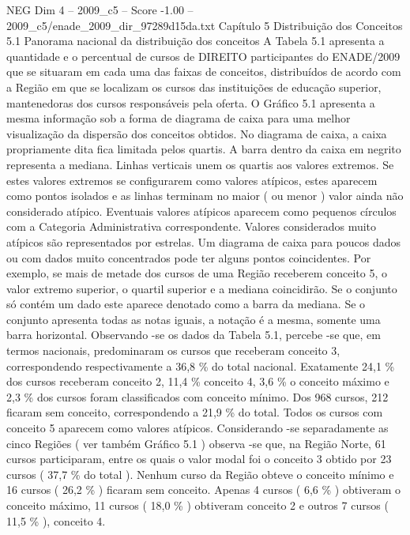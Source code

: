 \begin{textsample}{NEG Dim 4 – 2009\_c5 – Score -1.00 – 2009\_c5/enade\_2009\_dir\_97289d15da.txt}  \label{ex:f4_neg_086}
Capítulo 5 Distribuição dos Conceitos 5.1 Panorama nacional da distribuição dos conceitos A Tabela 5.1 apresenta a quantidade e o percentual de cursos de DIREITO participantes do ENADE/2009 que se situaram em cada uma das faixas de conceitos, distribuídos de acordo com a Região em que se localizam os cursos das instituições de educação superior, mantenedoras dos cursos responsáveis pela oferta.
O Gráfico 5.1 apresenta a mesma informação sob a forma de diagrama de caixa para uma melhor visualização da dispersão dos conceitos obtidos.
No diagrama de caixa, a caixa propriamente dita fica limitada pelos quartis.
A barra dentro da caixa em negrito representa a mediana.
Linhas verticais unem os quartis aos valores extremos.
Se estes valores extremos se configurarem como valores atípicos, estes aparecem como pontos isolados e as linhas terminam no maior ( ou menor ) valor ainda não considerado atípico.
Eventuais valores atípicos aparecem como pequenos círculos com a Categoria Administrativa correspondente.
Valores considerados muito atípicos são representados por estrelas.
Um diagrama de caixa para poucos dados ou com dados muito concentrados pode ter alguns pontos coincidentes.
Por exemplo, se mais de metade dos cursos de uma Região receberem conceito 5, o valor extremo superior, o quartil superior e a mediana coincidirão.
Se o conjunto só contém um dado este aparece denotado como a barra da mediana.
Se o conjunto apresenta todas as notas iguais, a notação é a mesma, somente uma barra horizontal.
Observando -se os dados da Tabela 5.1, percebe -se que, em termos nacionais, predominaram os cursos que receberam conceito 3, correspondendo respectivamente a 36,8 \% do total nacional.
Exatamente 24,1 \% dos cursos receberam conceito 2, 11,4 \% conceito 4, 3,6 \% o conceito máximo e 2,3 \% dos cursos foram classificados com conceito mínimo.
Dos 968 cursos, 212 ficaram sem conceito, correspondendo a 21,9 \% do total.
Todos os cursos com conceito 5 aparecem como valores atípicos.
Considerando -se separadamente as cinco Regiões ( ver também Gráfico 5.1 ) observa -se que, na Região Norte, 61 cursos participaram, entre os quais o valor modal foi o conceito 3 obtido por 23 cursos ( 37,7 \% do total ).
Nenhum curso da Região obteve o conceito mínimo e 16 cursos ( 26,2 \% ) ficaram sem conceito.
Apenas 4 cursos ( 6,6 \% ) obtiveram o conceito máximo, 11 cursos ( 18,0 \% ) obtiveram conceito 2 e outros 7 cursos ( 11,5 \% ), conceito 4.

\end{textsample}
